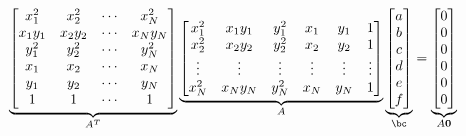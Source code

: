 \begin{problem}
\begin{enumalph}
\begin{answer}
        \begin{align*}
          \underbrace{\begin{bmatrix}
            x_1^2 & x_2^2 & \cdots & x_N^2 \\
            x_1y_1 & x_2y_2 & \cdots & x_Ny_N \\
            y_1^2 & y_2^2 & \cdots & y_N^2 \\
            x_1 & x_2 & \cdots & x_N \\
            y_1 & y_2 & \cdots & y_N \\
            1 & 1 & \cdots & 1 \\
          \end{bmatrix}}_{A^T}
          \underbrace{\begin{bmatrix}
            x_1^2 & x_1y_1 & y_1^2 & x_1 & y_1 & 1 \\
            x_2^2 & x_2y_2 & y_2^2 & x_2 & y_2 & 1 \\
            \vdots & \vdots & \vdots & \vdots & \vdots & \vdots \\
            x_N^2 & x_Ny_N & y_N^2 & x_N & y_N & 1 \\
          \end{bmatrix}}_{A}
          \underbrace{\begin{bmatrix}
            a \\
            b \\
            c \\
            d \\
            e \\
            f \\
          \end{bmatrix}}_{\bc}
          &=
          \underbrace{\begin{bmatrix}
            0 \\
            0 \\
            0 \\
            0 \\
            0 \\
            0 \\
          \end{bmatrix}}_{A \mathbf{0}}
        \end{align*}


\end{answer}
\end{enumalph}
\end{problem}
